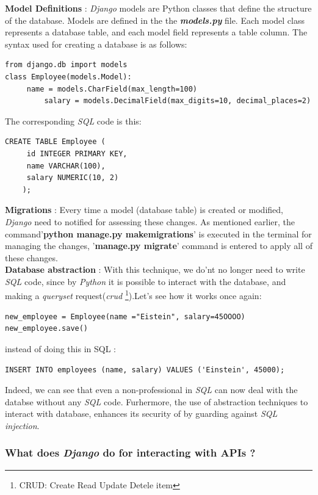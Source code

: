 \documentclass[12pt,a4paper]{report}
\begin{document}
\textbf{Model Definitions} : \textit{Django} models are Python classes that define the structure of the database. Models are defined in the the \textbf{\textit{models.py}} file. Each model class represents a database table, and each model field represents a table column. The syntax used for creating a database is as follows: 
\begin{lstlisting}[style=stylepython]
from django.db import models
class Employee(models.Model):
     name = models.CharField(max_length=100)
	     salary = models.DecimalField(max_digits=10, decimal_places=2)
\end{lstlisting} 
The corresponding \textit{SQL} code is this:  
\begin{lstlisting}[style=stylepython]
	CREATE TABLE Employee (
	 id INTEGER PRIMARY KEY,
	 name VARCHAR(100),
	 salary NUMERIC(10, 2)
	);
\end{lstlisting}  

 \textbf{Migrations} : Every time a model (database table) is created or modified, \textit{Django} need to notified for assessing these changes. As mentioned earlier, the command'\textbf{python manage.py makemigrations}' is executed in the terminal for managing the changes,  '\textbf{manage.py migrate}' command is entered to apply all of these changes.   \\
 
\textbf{ Database abstraction} : With this technique, we do'nt no longer need to write \textit{SQL} code, since by \textit{Python} it is possible to interact with the database, and making a \textit{queryset} request(\textit{crud}  \footnote{CRUD: Create Read Update Detele item}).Let's see how it works once again: 

\begin{lstlisting}[style=stylepython]
new_employee = Employee(name ="Eistein", salary=45OOOO) 
new_employee.save()
\end{lstlisting} 
instead of doing this in SQL : 
\begin{lstlisting}[style=stylepython]
INSERT INTO employees (name, salary) VALUES ('Einstein', 45000);
\end{lstlisting}  

Indeed, we can see that even a non-professional in \textit{SQL} can now deal with the databse without any \textit{SQL} code. \newline
Furhermore, the use of abstraction techniques to interact with database, enhances its security of by guarding against \textit{SQL injection}. 
\subsubsection{What does \textit{Django} do for interacting with APIs ?}
\end{document}
